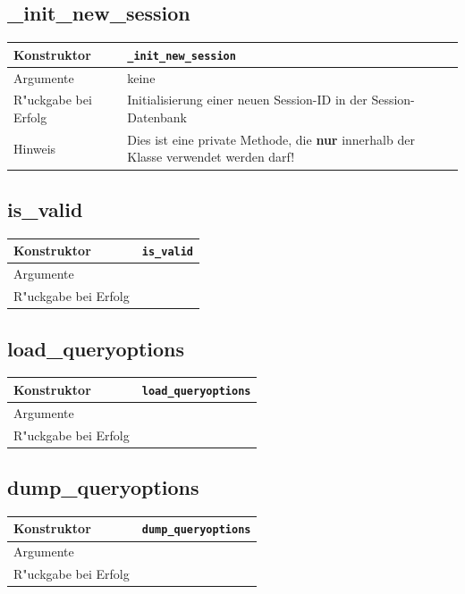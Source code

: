 \documentclass[11pt, twoside, a4paper, BCOR8mm, DIV12, bibtotoc,idxtotoc]{scrbook}
\begin{document}
\subsection{\_init\_new\_session}
\begin{shadowenv}
\begin{tabular}{lp{10cm}}
  Konstruktor & \texttt{\_init\_new\_session}\\
  \hline
  Argumente     & keine\\
  R"uckgabe bei Erfolg & Initialisierung einer neuen Session-ID in der
  Session-Datenbank\\
  \hline
  Hinweis  & Dies ist eine private Methode, die \textbf{nur} innerhalb
  der Klasse verwendet werden darf!\\
\end{tabular}
\end{shadowenv}

\subsection{is\_valid}
\begin{shadowenv}
\begin{tabular}{lp{10cm}}
  Konstruktor & \texttt{is\_valid}\\
  \hline
  Argumente     & \\
  R"uckgabe bei Erfolg & \\
\end{tabular}
\end{shadowenv}

\subsection{load\_queryoptions}
\begin{shadowenv}
\begin{tabular}{lp{10cm}}
  Konstruktor & \texttt{load\_queryoptions}\\
  \hline
  Argumente     & \\
  R"uckgabe bei Erfolg & \\
\end{tabular}
\end{shadowenv}

\subsection{dump\_queryoptions}
\begin{shadowenv}
\begin{tabular}{lp{10cm}}
  Konstruktor & \texttt{dump\_queryoptions}\\
  \hline
  Argumente     & \\
  R"uckgabe bei Erfolg & \\
\end{tabular}
\end{shadowenv}
\end{document}
